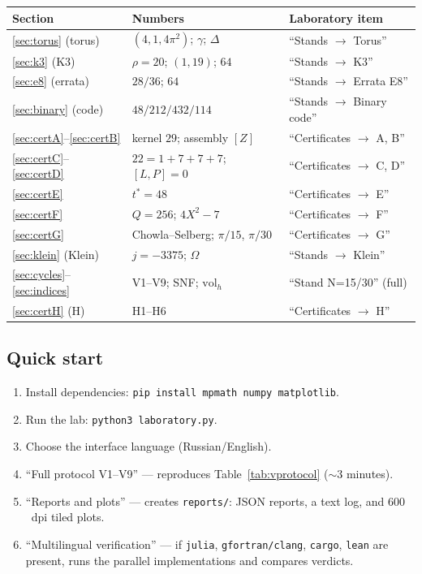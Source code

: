 \begin{center}
\small
\begin{tabularx}{\textwidth}{@{}l l >{\raggedright\arraybackslash}X@{}}
\toprule
Section & Numbers & Laboratory item \\
\midrule
\ref{sec:torus} (torus) & $(4,1,4\pi^2)$; $\gamma$; $\Delta$ &
``Stands $\to$ Torus'' \\
\ref{sec:k3} (K3) & $\rho=20$; $(1,19)$; $64$ & ``Stands $\to$ K3'' \\
\ref{sec:e8} (errata) & $28/36$; $64$ & ``Stands $\to$ Errata E8'' \\
\ref{sec:binary} (code) & $48/212/432/114$ & ``Stands $\to$ Binary
code'' \\
\ref{sec:certA}--\ref{sec:certB} & kernel $29$; assembly $[Z]$ &
``Certificates $\to$ A, B'' \\
\ref{sec:certC}--\ref{sec:certD} & $22=1+7+7+7$; $[L,P]=0$ &
``Certificates $\to$ C, D'' \\
\ref{sec:certE} & $t^*=48$ & ``Certificates $\to$ E'' \\
\ref{sec:certF} & $Q=256$; $4X^2-7$ & ``Certificates $\to$ F'' \\
\ref{sec:certG} & Chowla--Selberg; $\pi/15$, $\pi/30$ &
``Certificates $\to$ G'' \\
\ref{sec:klein} (Klein) & $j=-3375$; $\Omega$ & ``Stands $\to$
Klein'' \\
\ref{sec:cycles}--\ref{sec:indices} & V1--V9; SNF; $\mathrm{vol}_h$
& ``Stand N=15/30'' (full) \\
\ref{sec:certH} (H) & H1--H6 & ``Certificates $\to$ H'' \\
\bottomrule
\end{tabularx}
\end{center}

\subsection{Quick start}

\begin{enumerate}[leftmargin=2em, itemsep=0.15em]
\item Install dependencies: \texttt{pip install mpmath numpy
  matplotlib}.
\item Run the lab: \texttt{python3 laboratory.py}.
\item Choose the interface language (Russian/English).
\item ``Full protocol V1--V9'' --- reproduces
  Table~\ref{tab:vprotocol} ($\sim$3 minutes).
\item ``Reports and plots'' --- creates \texttt{reports/}: JSON
  reports, a text log, and $600$~dpi tiled plots.
\item ``Multilingual verification'' --- if \texttt{julia},
  \texttt{gfortran/clang}, \texttt{cargo}, \texttt{lean} are
  present, runs the parallel implementations and compares verdicts.
\end{enumerate}

